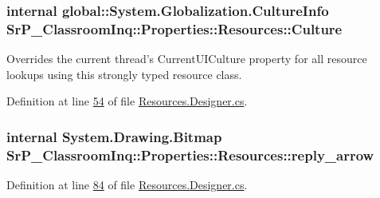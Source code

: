 \hypertarget{class_sr_p___classroom_inq_1_1_properties_1_1_resources_a1788010aa2d65a3c3244ec2f6ccd20ed}{
\subsubsection[{\-Culture}]{\setlength{\rightskip}{0pt plus 5cm}internal global\-::\-System.\-Globalization.\-Culture\-Info \-Sr\-P\-\_\-\-Classroom\-Inq\-::\-Properties\-::\-Resources\-::\-Culture}}
\label{class_sr_p___classroom_inq_1_1_properties_1_1_resources_a1788010aa2d65a3c3244ec2f6ccd20ed}


\-Overrides the current thread's \-Current\-U\-I\-Culture property for all resource lookups using this strongly typed resource class. 



\-Definition at line \hyperlink{_resources_8_designer_8cs_source_l00054}{54} of file \hyperlink{_resources_8_designer_8cs_source}{\-Resources.\-Designer.\-cs}.

\hypertarget{class_sr_p___classroom_inq_1_1_properties_1_1_resources_ab0a3e726876b922e1691be1f3853b481}{
\subsubsection[{reply\-\_\-arrow}]{\setlength{\rightskip}{0pt plus 5cm}internal \-System.\-Drawing.\-Bitmap \-Sr\-P\-\_\-\-Classroom\-Inq\-::\-Properties\-::\-Resources\-::reply\-\_\-arrow}}
\label{class_sr_p___classroom_inq_1_1_properties_1_1_resources_ab0a3e726876b922e1691be1f3853b481}


\-Definition at line \hyperlink{_resources_8_designer_8cs_source_l00084}{84} of file \hyperlink{_resources_8_designer_8cs_source}{\-Resources.\-Designer.\-cs}.

